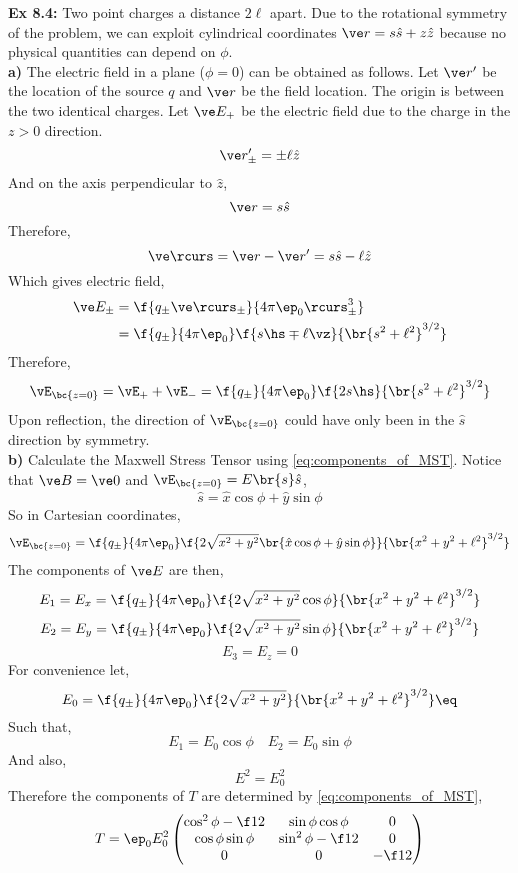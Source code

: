 \documentclass{article}
\begin{document}
\textbf{Ex 8.4:} Two point charges a distance $2 \ell$ apart. Due to the rotational symmetry of the problem, we can exploit cylindrical coordinates $\ve r = s\hat{s} + z \hat{z}$ because no physical quantities can depend on $\phi$.\\
\textbf{a)} The electric field in a plane ($\phi = 0$) can be obtained as follows. Let $\ve r'$ be the location of the source $q$ and $\ve r$ be the field location. The origin is between the two identical charges. Let $\ve E_{+}$ be the electric field due to the charge in the $z > 0$ direction.
\[ \ve r'_{\pm} = \pm \ell \hat{z} \]
And on the axis perpendicular to $\hat{z}$,
\[ \ve r = s \hat{s} \]
Therefore,
\[ \ve \rcurs = \ve r - \ve r' = s\hat{s} - \ell \hat z \]
Which gives electric field,
\begin{align*}
\ve E_{\pm} &= \f{q_{\pm} \ve \rcurs_\pm}{4 \pi \ep_0 \rcurs_\pm^3} \\
&= \f{q_{\pm}}{4 \pi \ep_0} \f{s \hs \mp \ell \vz}{\br{ s^2 + \ell^2}^{3/2}}
\end{align*}
Therefore,
\[ \vE_{\bc{z = 0}} = \vE_{+} + \vE_{-} = \f{q_{\pm}}{4 \pi \ep_0} \f{2 s \hs}{\br{ s^2 + \ell^2}^{3/2}} \]
Upon reflection, the direction of $\vE_{\bc{z = 0}}$ could have only been in the $\hat s$ direction by symmetry. \\
\textbf{b)} Calculate the Maxwell Stress Tensor using \cref{eq:components_of_MST}. Notice that $\ve B = \ve 0 $ and $\vE_{\bc{z=0}} = E\br{s} \hat{s}$,
\[ \hat{s} = \hat{x}\cos\phi + \hat{y}\sin\phi \]
So in Cartesian coordinates,
\[ \vE_{\bc{z = 0}} = \f{q_{\pm}}{4 \pi \ep_0} \f{2 \sqrt{x^2 + y^2}\br{\hat{x}\cos\phi + \hat{y}\sin\phi}}{\br{ x^2 + y^2 + \ell^2}^{3/2}} \]
The components of $\ve E$ are then,
\[ E_1 = E_x = \f{q_{\pm}}{4 \pi \ep_0} \f{2 \sqrt{x^2 + y^2}\cos\phi}{\br{ x^2 + y^2 + \ell^2}^{3/2}} \]
\[ E_2 = E_y = \f{q_{\pm}}{4 \pi \ep_0} \f{2 \sqrt{x^2 + y^2}\sin\phi}{\br{ x^2 + y^2 + \ell^2}^{3/2}} \]
\[ E_3 = E_z = 0 \]
For convenience let,
\[ E_0 = \f{q_{\pm}}{4 \pi \ep_0} \f{2 \sqrt{x^2 + y^2}}{\br{ x^2 + y^2 + \ell^2}^{3/2}} \eq \label{eq:E_0}\]
Such that,
\[ E_1 = E_0 \cos \phi \quad E_2 = E_0 \sin \phi\]
And also,
\[ E^2 = E_0^2 \]
Therefore the components of $T$ are determined by \cref{eq:components_of_MST},
\[ T = \ep_0 E_0^2 \begin{pmatrix}
    \cos^2 \phi - \f12 & \sin \phi \cos \phi & 0 \\
    \cos \phi \sin \phi & \sin^2 \phi - \f12 & 0 \\
    0 & 0 & - \f12 \\
\end{pmatrix} \]
\end{document}
